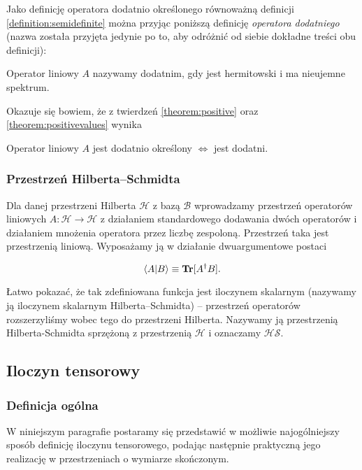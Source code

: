 Jako definicję operatora dodatnio określonego równoważną definicji \ref{definition:semidefinite} można przyjąc poniższą definicję \textit{operatora dodatniego} (nazwa została przyjęta jedynie po to, aby odróżnić od siebie dokładne treści obu definicji):

\begin{definition}
    Operator liniowy $A$ nazywamy dodatnim, gdy jest hermitowski i ma nieujemne spektrum.
\end{definition}

Okazuje się bowiem, że z twierdzeń \ref{theorem:positive} oraz \ref{theorem:positivevalues}  wynika

\begin{corollary}
    \label{corollary:iff}
    Operator liniowy $A$ jest dodatnio określony $\Longleftrightarrow$ jest dodatni.
\end{corollary}

\subsubsection{Przestrzeń Hilberta--Schmidta}

Dla danej przestrzeni Hilberta $\mathcal{H}$ z bazą $\mathcal{B}$ wprowadzamy przestrzeń operatorów liniowych $A: \mathcal{H} \rightarrow \mathcal{H}$ z działaniem standardowego dodawania dwóch operatorów i działaniem mnożenia operatora przez liczbę zespoloną. Przestrzeń taka jest przestrzenią liniową. Wyposażamy ją w działanie dwuargumentowe postaci

$$
    \bra{A}\ket{B} \equiv \textbf{Tr}[A ^ {\dag} B].
$$

Łatwo pokazać, że tak zdefiniowana funkcja jest iloczynem skalarnym (nazywamy ją iloczynem skalarnym Hilberta--Schmidta) -- przestrzeń operatorów rozszerzyliśmy wobec tego do przestrzeni Hilberta. Nazywamy ją przestrzenią Hilberta-Schmidta sprzężoną z przestrzenią $\mathcal{H}$ i oznaczamy $\mathcal{HS}$.


\subsection{Iloczyn tensorowy}

\subsubsection{Definicja ogólna}

W niniejszym paragrafie postaramy się przedstawić w możliwie najogólniejszy sposób definicję iloczynu tensorowego, podając następnie praktyczną jego realizację w przestrzeniach o wymiarze skończonym.

